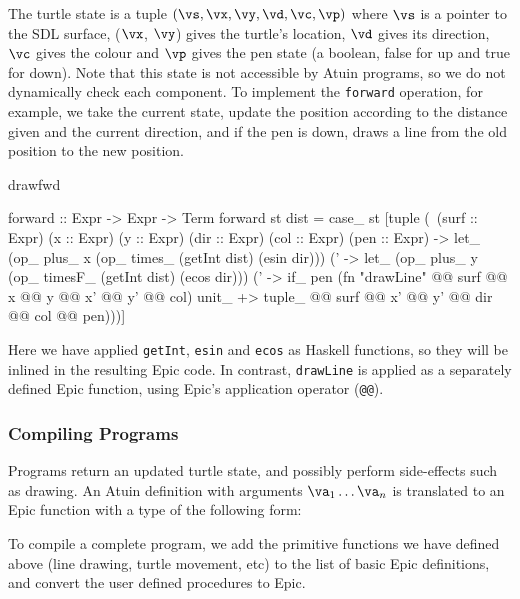 \noindent
The turtle state is a tuple
$(\vs,\vx,\vy,\vd,\vc,\vp)$ where $\vs$ is a pointer to the SDL
surface, ($\vx$, $\vy$) gives the turtle's location, $\vd$ gives its
direction, $\vc$ gives the colour and $\vp$ gives the pen
state (a boolean, false for up and true for down). Note that this
state is not accessible by Atuin programs, so we do not dynamically check
each component.
To implement the \texttt{forward} operation, for example, we take the
current state, update the position according to the distance
given and the current direction, and if the pen is down, draws a line
from the old position to the new position.

\begin{SaveVerbatim}{drawfwd}

forward :: Expr -> Expr -> Term
forward st dist = case_ st 
  [tuple (\ (surf :: Expr) (x :: Expr) (y :: Expr) 
            (dir :: Expr) (col :: Expr) (pen :: Expr) -> 
    let_ (op_ plus_ x (op_ times_ (getInt dist) (esin dir)))
      (\x' -> let_ (op_ plus_ y (op_ timesF_ (getInt dist) (ecos dir)))
      (\y' -> if_ pen (fn "drawLine" @@ surf @@ x @@ y 
                                     @@ x' @@ y' @@ col) unit_ +>
              tuple_ @@ surf @@ x' @@ y' @@ dir @@ col @@ pen)))]

\end{SaveVerbatim}

\noindent
Here we have applied \texttt{getInt}, \texttt{esin} and
\texttt{ecos} as Haskell functions, so they will be inlined in the resulting Epic code.
In contrast, \texttt{drawLine} is applied as a separately defined Epic
function, using Epic's application operator (\texttt{@@}).

\vspace*{-1em}
\subsubsection{Compiling Programs}

Programs return an updated turtle state, and possibly perform 
side-effects such as drawing. An Atuin definition with
arguments $\va_1\ldots\va_n$ is translated to an Epic function
with a type of the following form:


\noindent
To compile a complete program, we add the primitive functions we have
defined above (line drawing, turtle movement, etc) to the list of
basic Epic definitions, and convert the user defined procedures to Epic.

